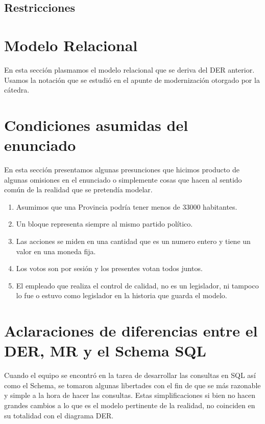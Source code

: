 \documentclass[10pt, a4paper]{article}
\begin{document}
	\newpage
	\subsection{Restricciones}
	
		

\section{Modelo Relacional}

En esta secci\'on plasmamos el modelo relacional que se deriva del DER anterior. Usamos la notaci\'on que se estudi\'o en el apunte de modernizaci\'on otorgado por la c\'atedra.

	

\section{Condiciones asumidas del enunciado}

En esta secci\'on presentamos algunas presunciones que hicimos producto de algunas omisiones en el enunciado o simplemente cosas que hacen al sentido com\'un de la realidad que se pretend\'ia modelar.

\begin{enumerate}
	\item Asumimos que una Provincia podr\'ia tener menos de 33000 habitantes.

	\item Un bloque representa siempre al mismo partido pol\'itico.
	\item Las acciones se miden en una cantidad que es un numero entero y tiene un valor en una moneda fija.
	\item Los votos son por sesi\'on y los presentes votan todos juntos. 
	\item El empleado que realiza el control de calidad, no es un legislador, ni tampoco lo fue o estuvo como legislador en la historia que guarda el modelo.	
\end{enumerate}


\section{Aclaraciones de diferencias entre el DER, MR y el Schema SQL}

Cuando el equipo se encontr\'o en la tarea de desarrollar las consultas en SQL as\'i como el Schema, se tomaron algunas libertades con el fin de que se m\'as razonable y simple a la hora de hacer las consultas. Estas simplificaciones si bien no hacen grandes cambios a lo que es el modelo pertinente de la realidad, no coinciden en su totalidad con el diagrama DER. 
\end{document}
